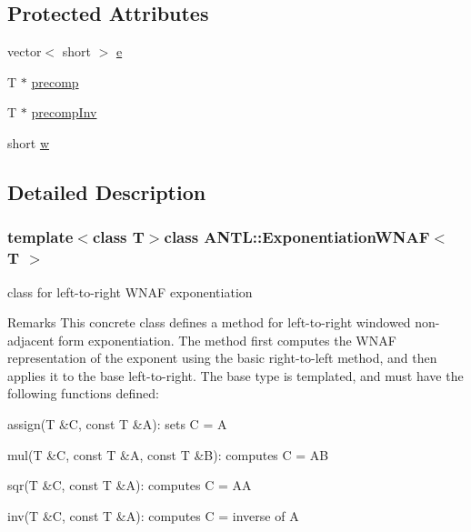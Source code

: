 \subsection*{Protected Attributes}
\begin{DoxyCompactItemize}
\item 
vector$<$ short $>$ \hyperlink{classANTL_1_1ExponentiationWNAF_af0a23c1341f752e8f36ba56b38d9d33b}{e}
\item 
T $\ast$ \hyperlink{classANTL_1_1ExponentiationWNAF_a8d2b1e59c758d66f2e8a1bc0d2cb3f50}{precomp}
\item 
T $\ast$ \hyperlink{classANTL_1_1ExponentiationWNAF_aebe9720da10b933ec0fc19f510ca18bc}{precomp\-Inv}
\item 
short \hyperlink{classANTL_1_1ExponentiationWNAF_aeeeaf680db26d52f56783a6a5a761066}{w}
\end{DoxyCompactItemize}


\subsection{Detailed Description}
\subsubsection*{template$<$class T$>$class A\-N\-T\-L\-::\-Exponentiation\-W\-N\-A\-F$<$ T $>$}

class for left-\/to-\/right W\-N\-A\-F exponentiation 

\begin{DoxyRemark}{Remarks}
This concrete class defines a method for left-\/to-\/right windowed non-\/adjacent form exponentiation. The method first computes the W\-N\-A\-F representation of the exponent using the basic right-\/to-\/left method, and then applies it to the base left-\/to-\/right. The base type is templated, and must have the following functions defined\-:
\begin{DoxyItemize}
\item assign(\-T \&\-C, const T \&\-A)\-: sets C = A
\item mul(\-T \&\-C, const T \&\-A, const T \&\-B)\-: computes C = A\-B
\item sqr(\-T \&\-C, const T \&\-A)\-: computes C = A\-A
\item inv(\-T \&\-C, const T \&\-A)\-: computes C = inverse of A 
\end{DoxyItemize}
\end{DoxyRemark}


